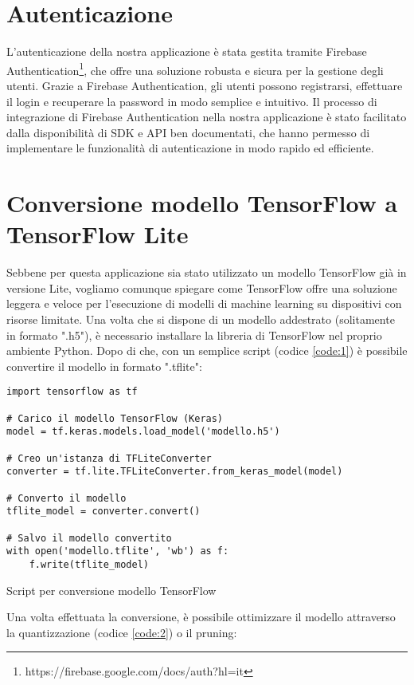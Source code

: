 \section{Autenticazione}
L'autenticazione della nostra applicazione è stata gestita tramite Firebase Authentication\footnote{https://firebase.google.com/docs/auth?hl=it}, che
offre una soluzione robusta e sicura per la gestione degli utenti. Grazie a Firebase Authentication, gli utenti possono registrarsi, effettuare il login
e recuperare la password in modo semplice e intuitivo. Il processo di integrazione di Firebase Authentication nella nostra applicazione è stato facilitato
dalla disponibilità di SDK e API ben documentati, che hanno permesso di implementare le funzionalità di autenticazione in modo rapido ed efficiente.


\section{Conversione modello TensorFlow a TensorFlow Lite}
Sebbene per questa applicazione sia stato utilizzato un modello TensorFlow già in versione Lite, vogliamo comunque spiegare come TensorFlow offre una
soluzione leggera e veloce per l'esecuzione di modelli di machine learning su dispositivi con risorse limitate. Una volta che si dispone di un modello
addestrato (solitamente in formato ".h5"), è necessario installare la libreria di TensorFlow nel proprio ambiente Python. Dopo di che, con un semplice 
script (codice \ref{code:1}) è possibile convertire il modello in formato ".tflite":

\begin{code}
\begin{verbatim}
import tensorflow as tf
    
# Carico il modello TensorFlow (Keras)
model = tf.keras.models.load_model('modello.h5')

# Creo un'istanza di TFLiteConverter
converter = tf.lite.TFLiteConverter.from_keras_model(model)

# Converto il modello
tflite_model = converter.convert()

# Salvo il modello convertito
with open('modello.tflite', 'wb') as f:
    f.write(tflite_model)
\end{verbatim}
\caption{Script per conversione modello TensorFlow}
\label{code:1}
\end{code}
\bigskip

Una volta effettuata la conversione, è possibile ottimizzare il modello attraverso la quantizzazione (codice \ref{code:2}) o il pruning:

